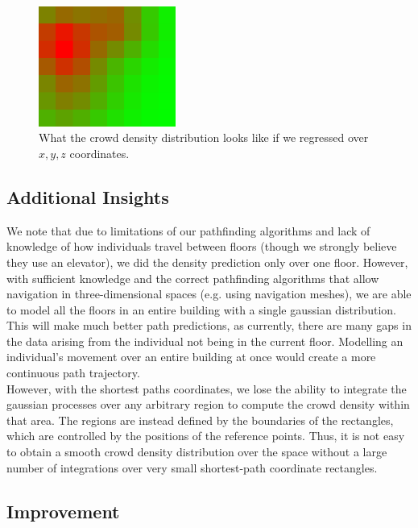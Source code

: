 \documentclass[letterpaper]{article}
\begin{document}
\begin{figure}[h!]
  \centering
    \includegraphics[width=170px]{diagrams/1_1216440525p.png}
  \caption{What the crowd density distribution looks like if we regressed over $x,y,z$ coordinates.}
  \label{fig:xyzdist}
\end{figure}


\subsection{Additional Insights}

We note that due to limitations of our pathfinding algorithms and lack of knowledge of how individuals travel between floors (though we strongly believe they use an elevator), we did the density prediction only over one floor. However, with sufficient knowledge and the correct pathfinding algorithms that allow navigation in three-dimensional spaces (e.g. using navigation meshes), we are able to model all the floors in an entire building with a single gaussian distribution. This will make much better path predictions, as currently, there are many gaps in the data arising from the individual not being in the current floor. Modelling an individual's movement over an entire building at once would create a more continuous path trajectory.\\

However, with the shortest paths coordinates, we lose the ability to integrate the gaussian processes over any arbitrary region to compute the crowd density within that area. The regions are instead defined by the boundaries of the rectangles, which are controlled by the positions of the reference points. Thus, it is not easy to obtain a smooth crowd density distribution over the space without a large number of integrations over very small shortest-path coordinate rectangles.\\

\subsection{Improvement}
\end{document}
